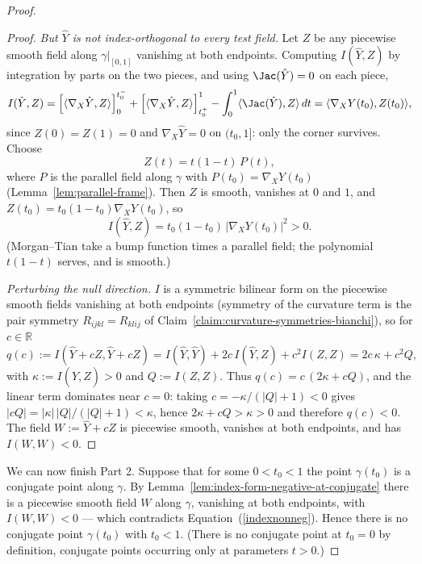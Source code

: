 \begin{proof}
\begin{proof}
\emph{But $\hat Y$ is not index-orthogonal to every test field.} Let $Z$ be any
piecewise smooth field along $\gamma|_{[0,1]}$ vanishing at both endpoints.
Computing $I(\hat Y,Z)$ by integration by parts on the two pieces, and using
$\Jac(\hat Y)=0$ on each piece,
$$I(\hat Y,Z)
=\Bigl[\langle\nabla_X\hat Y,Z\rangle\Bigr]_0^{t_0^-}
+\Bigl[\langle\nabla_X\hat Y,Z\rangle\Bigr]_{t_0^+}^{1}
-\int_0^1\langle \Jac(\hat Y),Z\rangle\,dt
=\langle\nabla_XY(t_0),Z(t_0)\rangle,$$
since $Z(0)=Z(1)=0$ and $\nabla_X\hat Y=0$ on $(t_0,1]$: only the corner
survives. Choose
$$Z(t)=t(1-t)\,P(t),$$
where $P$ is the parallel field along $\gamma$ with $P(t_0)=\nabla_XY(t_0)$
(Lemma~\ref{lem:parallel-frame}). Then $Z$ is smooth, vanishes at $0$ and $1$,
and $Z(t_0)=t_0(1-t_0)\nabla_XY(t_0)$, so
$$I(\hat Y,Z)=t_0(1-t_0)\,|\nabla_XY(t_0)|^2>0 .$$
(Morgan--Tian take a bump function times a parallel field; the polynomial
$t(1-t)$ serves, and is smooth.)

\emph{Perturbing the null direction.} $I$ is a symmetric bilinear form on the
piecewise smooth fields vanishing at both endpoints (symmetry of the curvature
term is the pair symmetry $R_{ijkl}=R_{klij}$ of
Claim~\ref{claim:curvature-symmetries-bianchi}), so for $c\in\mathbb R$
$$q(c):=I(\hat Y+cZ,\hat Y+cZ)=I(\hat Y,\hat Y)+2c\,I(\hat Y,Z)+c^2 I(Z,Z)
=2c\,\kappa+c^2Q,$$
with $\kappa:=I(\hat Y,Z)>0$ and $Q:=I(Z,Z)$. Thus $q(c)=c\,(2\kappa+cQ)$, and
the linear term dominates near $c=0$: taking $c=-\kappa/(|Q|+1)<0$ gives
$|cQ|=|\kappa|\,|Q|/(|Q|+1)<\kappa$, hence $2\kappa+cQ>\kappa>0$ and therefore
$q(c)<0$. The field $W:=\hat Y+cZ$ is piecewise smooth, vanishes at both
endpoints, and has $I(W,W)<0$.
\end{proof}

We can now finish Part 2. Suppose that for some $0<t_0<1$ the point
$\gamma(t_0)$ is a conjugate point along $\gamma$. By
Lemma~\ref{lem:index-form-negative-at-conjugate} there is a piecewise smooth
field $W$ along $\gamma$, vanishing at both endpoints, with $I(W,W)<0$ --- which
contradicts Equation~(\ref{indexnonneg}). Hence there is no conjugate point
$\gamma(t_0)$ with $t_0<1$. (There is no conjugate point at $t_0=0$ by
definition, conjugate points occurring only at parameters $t>0$.)
\end{proof}

